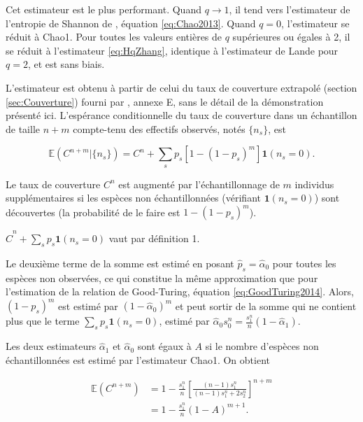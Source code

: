 \documentclass[
  11pt,
  french,
  a4paper,
  extrafontsizes,onecolumn,openright
  ]{memoir}
\begin{document}
Cet estimateur est le plus performant. Quand \(q \to 1\), il tend vers l'estimateur de l'entropie de Shannon de \textcite{Chao2013}, équation \eqref{eq:Chao2013}.
Quand \(q=0\), l'estimateur se réduit à Chao1. Pour toutes les valeurs entières de \(q\) supérieures ou égales à 2, il se réduit à l'estimateur \eqref{eq:HqZhang}, identique à l'estimateur de Lande pour \(q=2\), et est sans biais.

L'estimateur est obtenu à partir de celui du taux de couverture extrapolé (section \ref{sec:Couverture}) fourni par \textcite{Chao2012b}, annexe E, sans le détail de la démonstration présenté ici.
L'espérance conditionnelle du taux de couverture dans un échantillon de taille \(n+m\) compte-tenu des effectifs observés, notés \(\{n_s\}\), est

\begin{equation}
  \label{eq:EspCnm}
  {\mathbb E}\left(C^{n+m} | \{n_s\} \right)
  = C^{n} + \sum_s{p_s [1-(1-p_s)^m] \mathbf{1}(n_s=0)}.
\end{equation}

Le taux de couverture \(C^{n}\) est augmenté par l'échantillonnage de \(m\) individus supplémentaires si les espèces non échantillonnées (vérifiant \(\mathbf{1}(n_s=0)\)) sont découvertes (la probabilité de le faire est \(1-(1-p_s)^m\)).

\(\hat{C}^{n} + \sum_s{p_s \mathbf{1}(n_s=0)}\) vaut par définition 1.

Le deuxième terme de la somme est estimé en posant \(\hat{p}_s = \hat{\alpha}_0\) pour toutes les espèces non observées, ce qui constitue la même approximation que pour l'estimation de la relation de Good-Turing, équation \eqref{eq:GoodTuring2014}.
Alors, \((1-p_s)^m\) est estimé par \((1-\hat{\alpha}_0)^m\) et peut sortir de la somme qui ne contient plus que le terme \(\sum_s{p_s}\mathbf{1}(n_s=0)\), estimé par \(\hat{\alpha}_0 {s^{n}_{0}} = \frac{s^{n}_{1}}{n}(1 - \hat{\alpha}_1)\).

Les deux estimateurs \(\hat{\alpha}_1\) et \(\hat{\alpha}_0\) sont égaux à \(A\) si le nombre d'espèces non échantillonnées est estimé par l'estimateur Chao1.
On obtient

\begin{align} 
  \label{eq:Cnm}
  {\mathbb E}\left(C^{n+m} \right)
  &= 1-\frac{s^{n}_{1}}{n} 
    \left[ \frac{\left(n-1\right)s^{n}_{1}}{\left(n-1\right)s^{n}_{1}+2s^{n}_{2}} \right]^{n+m} \\
  &= 1-\frac{s^{n}_{1}}{n} \left( 1-A \right)^{m+1}.
\end{align}
\end{document}
